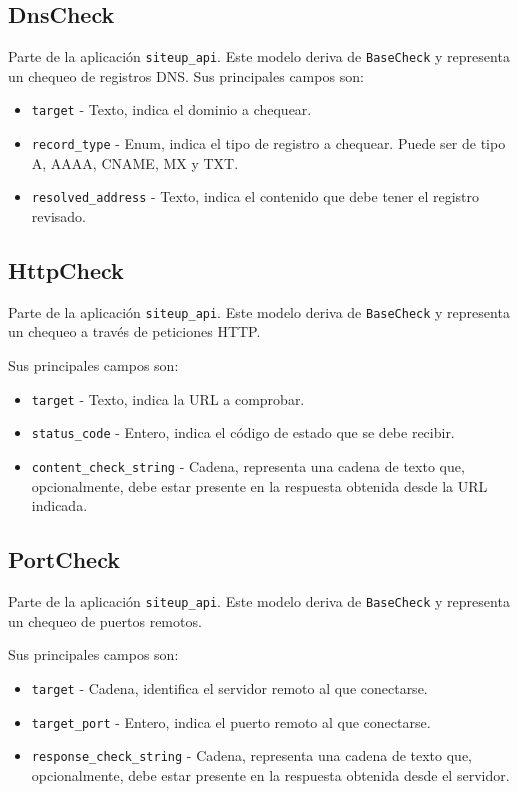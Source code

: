 \subsection{DnsCheck}

Parte de la aplicación \texttt{siteup\_api}. Este modelo deriva de
\texttt{BaseCheck} y representa un chequeo de registros DNS. Sus principales campos son:

\begin{itemize}
\item \texttt{target} - Texto, indica el dominio a chequear.
\item \texttt{record\_type} - Enum, indica el tipo de registro a chequear. Puede ser de tipo A, AAAA, CNAME, MX y TXT.
\item \texttt{resolved\_address} - Texto, indica el contenido que debe tener el registro revisado.
\end{itemize}

\subsection{HttpCheck}

Parte de la aplicación \texttt{siteup\_api}. Este modelo deriva de
\texttt{BaseCheck} y representa un chequeo a través de peticiones HTTP.

Sus principales campos son:

\begin{itemize}
\item \texttt{target} - Texto, indica la URL a comprobar.
\item \texttt{status\_code} - Entero, indica el código de estado que se debe recibir.
\item \texttt{content\_check\_string} - Cadena, representa una cadena de texto
  que, opcionalmente, debe estar presente en la respuesta obtenida desde la URL indicada.
\end{itemize}

\subsection{PortCheck}

Parte de la aplicación \texttt{siteup\_api}. Este modelo deriva de
\texttt{BaseCheck} y representa un chequeo de puertos remotos.

Sus principales campos son:

\begin{itemize}
\item \texttt{target} - Cadena, identifica el servidor remoto al que conectarse.
\item \texttt{target\_port} - Entero, indica el puerto remoto al que conectarse.
\item \texttt{response\_check\_string} - Cadena, representa una cadena de texto
  que, opcionalmente, debe estar presente en la respuesta obtenida desde el servidor.
\end{itemize}

